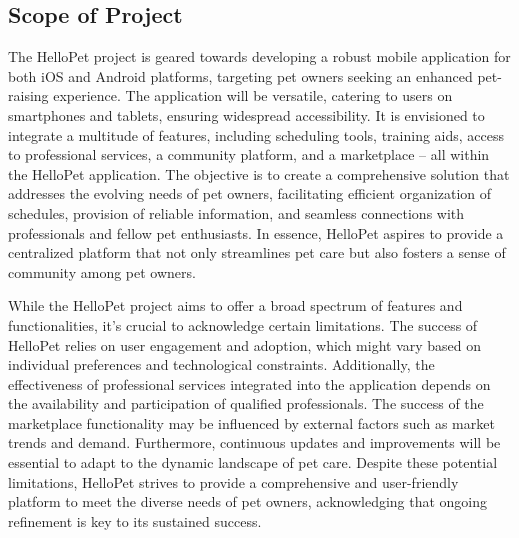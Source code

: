 \subsection{Scope of Project}
The HelloPet project is geared towards developing a robust mobile application for both iOS and Android platforms, targeting pet owners seeking an enhanced pet-raising experience. The application will be versatile, catering to users on smartphones and tablets, ensuring widespread accessibility. It is envisioned to integrate a multitude of features, including scheduling tools, training aids, access to professional services, a community platform, and a marketplace – all within the HelloPet application. The objective is to create a comprehensive solution that addresses the evolving needs of pet owners, facilitating efficient organization of schedules, provision of reliable information, and seamless connections with professionals and fellow pet enthusiasts. In essence, HelloPet aspires to provide a centralized platform that not only streamlines pet care but also fosters a sense of community among pet owners.

\noindent While the HelloPet project aims to offer a broad spectrum of features and functionalities, it's crucial to acknowledge certain limitations. The success of HelloPet relies on user engagement and adoption, which might vary based on individual preferences and technological constraints. Additionally, the effectiveness of professional services integrated into the application depends on the availability and participation of qualified professionals. The success of the marketplace functionality may be influenced by external factors such as market trends and demand. Furthermore, continuous updates and improvements will be essential to adapt to the dynamic landscape of pet care. Despite these potential limitations, HelloPet strives to provide a comprehensive and user-friendly platform to meet the diverse needs of pet owners, acknowledging that ongoing refinement is key to its sustained success.


